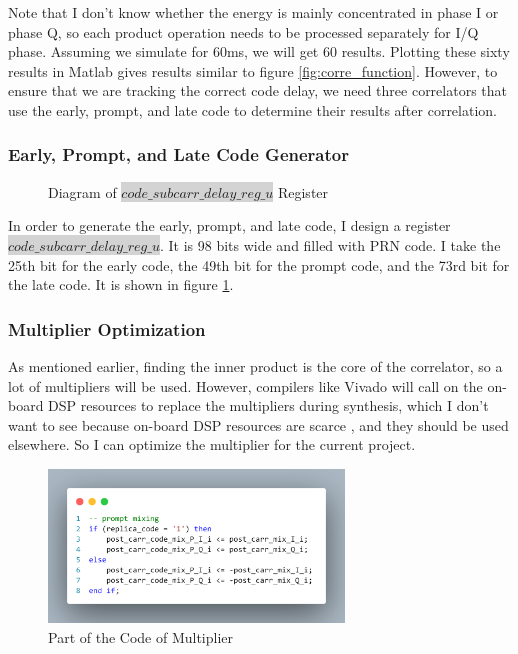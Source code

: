 Note that I don't know whether the energy is mainly concentrated in phase I or phase Q, so each product operation needs to be processed separately for I/Q phase. Assuming we simulate for 60ms, we will get 60 results. Plotting these sixty results in Matlab gives results similar to figure \ref{fig:corre_function}. However, to ensure that we are tracking the correct code delay, we need three correlators that use the early, prompt, and late code to determine their results after correlation.

\subsubsection{Early, Prompt, and Late Code Generator}
\begin{figure}[!htbp]
    \centering
    
    \caption{Diagram of \colorbox{lightgray}{$code\_subcarr\_delay\_reg\_u$} Register}
    \label{fig:prompt_code}
\end{figure}

In order to generate the early, prompt, and late code, I design a register\\ \colorbox{lightgray}{$code\_subcarr\_delay\_reg\_u$}. It is 98 bits wide and filled with PRN  code. I take the 25th bit for the early code, the 49th bit for the prompt code, and the 73rd bit for the late code. It is shown in figure \ref{fig:prompt_code}.

\subsubsection{Multiplier Optimization}
As mentioned earlier, finding the inner product is the core of the correlator, so a lot of multipliers will be used. However, compilers like Vivado will call on the on-board DSP resources to replace the multipliers during synthesis, which I don't want to see because on-board DSP resources are scarce \cite{RN208, RN209}, and they should be used elsewhere. So I can optimize the multiplier for the current project.

\begin{figure}[!htbp]
    \centering
    \includegraphics[width=0.7\textwidth]{_IMAGES/multiplier_code.png}
    \caption{Part of the Code of Multiplier}
    \label{fig:multiplier_code}
\end{figure}

